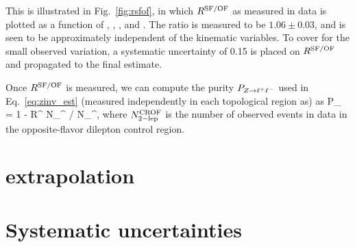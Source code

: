 This is illustrated in Fig.~\ref{fig:rsfof}, in which $R^{\mathrm{SF/OF}}$ as measured in data is plotted
as a function of \Ht, \mttwo, \Nj, and \Nb. The ratio is measured to be $1.06\pm0.03$, and is seen to 
be approximately independent of the kinematic variables. To cover for the small observed variation, 
a systematic uncertainty of 0.15 is placed on $R^{\mathrm{SF/OF}}$ and propagated to the final estimate.

Once $R^{\mathrm{SF/OF}}$ is measured, we can compute the purity $P_{Z\to\ell^+\ell^-}$ used in Eq.~\ref{eq:zinv_est} 
(measured independently in each topological region as) as
\be
P_{\zll} = 1 - R^ N_^ / N_^,
\ee
where $N_{\mathrm{2-lep}}^{\mathrm{CROF}}$ is the number of observed events in data in the opposite-flavor
dilepton control region.



\section{\texorpdfstring{\mttwo}{MT2} extrapolation}
\label{sec:zinv_mt2}

\section{Systematic uncertainties}
\label{sec:zinv_syst}
